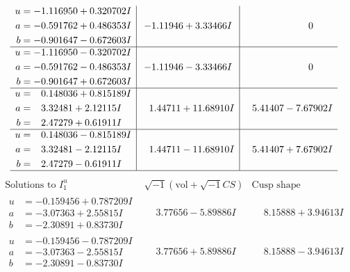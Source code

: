 \documentclass[1p]{elsarticle_modified}
\theoremstyle{definition}
\newcommand{\I}{\sqrt{-1}}
\begin{document}
$$\begin{array}{c|c|c}
\begin{aligned}
u &= -1.116950 + 0.320702 I \\
a &= -0.591762 + 0.486353 I \\
b &= -0.901647 - 0.672603 I\end{aligned}
 & -1.11946 + 3.33466 I & \phantom{-0.000000 } 0 \\ \hline\begin{aligned}
u &= -1.116950 - 0.320702 I \\
a &= -0.591762 - 0.486353 I \\
b &= -0.901647 + 0.672603 I\end{aligned}
 & -1.11946 - 3.33466 I & \phantom{-0.000000 } 0 \\ \hline\begin{aligned}
u &= \phantom{-}0.148036 + 0.815189 I \\
a &= \phantom{-}3.32481 + 2.12115 I \\
b &= \phantom{-}2.47279 + 0.61911 I\end{aligned}
 & \phantom{-}1.44711 + 11.68910 I & \phantom{-}5.41407 - 7.67902 I \\ \hline\begin{aligned}
u &= \phantom{-}0.148036 - 0.815189 I \\
a &= \phantom{-}3.32481 - 2.12115 I \\
b &= \phantom{-}2.47279 - 0.61911 I\end{aligned}
 & \phantom{-}1.44711 - 11.68910 I & \phantom{-}5.41407 + 7.67902 I\\
 \hline 
 \end{array}$$\newpage$$\begin{array}{c|c|c}  
\text{Solutions to }I^u_{1}& \I (\text{vol} + \sqrt{-1}CS) & \text{Cusp shape}\\
 \hline 
\begin{aligned}
u &= -0.159456 + 0.787209 I \\
a &= -3.07363 + 2.55815 I \\
b &= -2.30891 + 0.83730 I\end{aligned}
 & \phantom{-}3.77656 - 5.89886 I & \phantom{-}8.15888 + 3.94613 I \\ \hline\begin{aligned}
u &= -0.159456 - 0.787209 I \\
a &= -3.07363 - 2.55815 I \\
b &= -2.30891 - 0.83730 I\end{aligned}
 & \phantom{-}3.77656 + 5.89886 I & \phantom{-}8.15888 - 3.94613 I \\ \hline\begin{aligned}

\end{aligned}
\end{array}$$
\end{document}
